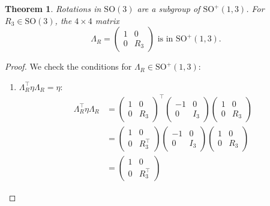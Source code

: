 \documentclass{amsart}
\newtheorem{theorem}{Theorem}[section]
\theoremstyle{definition}
\theoremstyle{remark}
\begin{document}
\begin{theorem}\label{thm:so3_rotations_in_so13}
  Rotations in $\mathrm{SO}(3)$ are a subgroup of $\mathrm{SO}^+(1,3)$. For $R_3\in\mathrm{SO}(3)$, the $4 \times 4$ matrix
  \begin{equation*}
    \Lambda_R =
    \begin{pmatrix}
      1 & 0 \\
      0 & R_3
    \end{pmatrix} \text{ is in } \mathrm{SO}^+(1,3).
  \end{equation*}
\end{theorem}
\begin{proof}
  We check the conditions for $\Lambda_R \in \mathrm{SO}^+(1,3)$:
  \begin{enumerate}
      \item $\Lambda_R^\top \eta \Lambda_R = \eta$:
        \begin{align*}
          \Lambda_R^\top\eta \Lambda_R &=
          \begin{pmatrix}
            1 & 0 \\
            0 & R_3
          \end{pmatrix}^\top
          \begin{pmatrix}
            -1 & 0 \\
            0 & I_3
          \end{pmatrix}
          \begin{pmatrix}
            1 & 0 \\
            0 & R_3
          \end{pmatrix} \\
          &=
          \begin{pmatrix}
            1 & 0 \\
            0 & R_3^\top
          \end{pmatrix}
          \begin{pmatrix}
            -1 & 0 \\
            0 & I_3
          \end{pmatrix}
          \begin{pmatrix}
            1 & 0 \\
            0 & R_3
          \end{pmatrix} \\
          &=
          \begin{pmatrix}
            1 & 0 \\
            0 & R_3^\top
          \end{pmatrix}

\end{align*}
\end{enumerate}
\end{proof}
\end{document}
